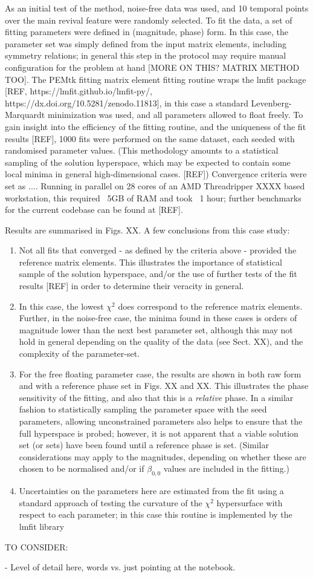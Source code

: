 As an initial test of the method, noise-free data was used, and 10 temporal points over the main revival feature were randomly selected. To fit the data, a set of fitting parameters were defined in (magnitude, phase) form. In this case, the parameter set was simply defined from the input matrix elements, including symmetry relations; in general this step in the protocol may require manual configuration for the problem at hand [MORE ON THIS? MATRIX METHOD TOO]. The PEMtk fitting matrix element fitting routine wraps the lmfit package [REF, https://lmfit.github.io/lmfit-py/, https://dx.doi.org/10.5281/zenodo.11813], in this case a standard Levenberg-Marquardt minimization was used, and all parameters allowed to float freely. To gain insight into the efficiency of the fitting routine, and the uniqueness of the fit results [REF], 1000 fits were performed on the same dataset, each seeded with randomised parameter values. (This methodology amounts to a statistical sampling of the solution hyperspace, which may be expected to contain some local minima in general high-dimensional cases. [REF]) Convergence criteria were set as .... Running in parallel on 28 cores of an AMD Threadripper XXXX based workstation, this required ~5GB of RAM and took ~1 hour; further benchmarks for the current codebase can be found at [REF].

Results are summarised in Figs. XX. A few conclusions from this case study:

\begin{enumerate}
\item Not all fits that converged - as defined by the criteria above - provided the reference matrix elements. This illustrates the importance of statistical sample of the solution hyperspace, and/or the use of further tests of the fit results [REF] in order to determine their veracity in general.
\item In this case, the lowest $\chi^2$ does correspond to the reference matrix elements. Further, in the noise-free case, the minima found in these cases is orders of magnitude lower than the next best parameter set, although this may not hold in general depending on the quality of the data (see Sect. XX), and the complexity of the parameter-set.
\item For the free floating parameter case, the results are shown in both raw form and with a reference phase set in Figs. XX and XX. This illustrates the phase sensitivity of the fitting, and also that this is a \textit{relative} phase. In a similar fashion to statistically sampling the parameter space with the seed parameters, allowing unconstrained parameters also helps to ensure that the full hyperspace is probed; however, it is not apparent that a viable solution set (or sets) have been found until a reference phase is set. (Similar considerations may apply to the magnitudes, depending on whether these are chosen to be normalised and/or if $\beta_{0,0}$ values are included in the fitting.)
\item Uncertainties on the parameters here are estimated from the fit using a standard approach of testing the curvature of the $\chi^2$ hypersurface with respect to each parameter; in this case this routine is implemented by the lmfit library
\end{enumerate}

TO CONSIDER:

- Level of detail here, words vs. just pointing at the notebook.